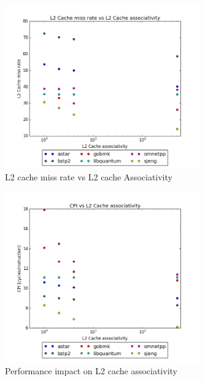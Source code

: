 \documentclass{article}
\begin{document}
\begin{figure}[ht]
    \centering
    \includegraphics[width=0.75\textwidth]{plots/L2cache_miss_vs_L2cache_associativity.png}
    \caption{L2 cache miss rate vs L2 cache Associativity}
    \label{fig:l2missvsl2assoc}
\end{figure}

\begin{figure}[ht]
    \centering
    \includegraphics[width=0.75\textwidth]{plots/CPI_vs_L2Cache_associativity.png}
    \caption{Performance impact on L2 cache associativity}
    \label{fig:cpivsl2assoc}
\end{figure}
\end{document}
